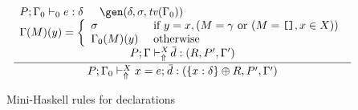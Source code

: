 \begin{figure}
\[\begin{array}{cc}
	\displaystyle\frac
	 {\begin{array}{ll}
           P;\Gamma_0 \vdash_0 e : \delta \: & \: \gen(\delta,\sigma,\tv(\Gamma_0))\\
           \multicolumn{2}{c}{\Gamma(M)(y) = \left\{ \begin{array}{ll}
                                    \sigma & \text{ if } y = x, (M = \gamma \text{ or }
                                                                 (M = \texttt{[]}, x \in X)) \\
                                      \Gamma_0(M)(y) & \text{ otherwise } 
                                   \end{array}\right. }\\[.2cm]                   
           \multicolumn{2}{c}{P;\Gamma \vdash_{\Uparrow}^X \overline{\!d} : (R,P',\Gamma')}
          \end{array}}
	 {P;\Gamma_0 \vdash_{\Uparrow}^X x = e;\: \overline{\!d} : (\{x:\delta\} \oplus R,P',\Gamma')} 
\end{array} \]
\caption{Mini-Haskell rules for declarations}
\label{fig:mini-haskell-rules-for-declarations}
\end{figure}

